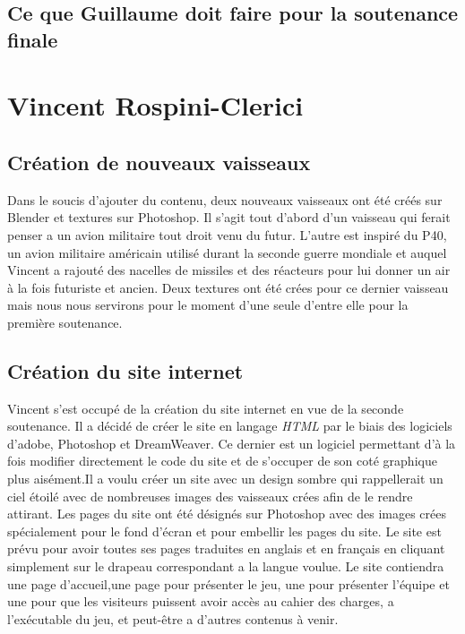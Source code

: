 \documentclass[10pt, titlepage]{report}
\begin{document}
\subsection{Ce que Guillaume doit faire pour la soutenance finale}

\section{Vincent Rospini-Clerici}

\subsection{Création de nouveaux vaisseaux}
Dans le soucis d'ajouter du contenu, deux nouveaux vaisseaux ont été créés sur Blender et textures sur Photoshop. Il s'agit tout d'abord d'un vaisseau qui ferait penser a un avion militaire tout droit venu du futur. L'autre est inspiré du P40, un avion militaire américain utilisé durant la seconde guerre mondiale et auquel Vincent a rajouté des nacelles de missiles et des réacteurs pour lui donner un air à la fois futuriste et ancien. Deux textures ont été crées pour ce dernier vaisseau mais nous nous servirons pour le moment d'une seule d'entre elle pour la première soutenance.

\subsection{Création du site internet}
Vincent s'est occupé de la création du site internet en vue de la seconde soutenance. Il a décidé de créer le site en langage \textit{HTML} par le biais des logiciels d'adobe, Photoshop et DreamWeaver. Ce dernier est un logiciel permettant d'à la fois modifier directement le code du site et de s'occuper de son coté graphique plus aisément.Il a voulu créer un site avec un design sombre qui rappellerait un ciel étoilé avec de nombreuses images des vaisseaux crées afin de le rendre attirant. Les pages du site ont été désignés sur Photoshop avec des images crées spécialement pour le fond d'écran et pour embellir les pages du site. Le site est prévu pour avoir toutes ses pages traduites en anglais et en français en cliquant simplement sur le drapeau correspondant a la langue voulue. Le site contiendra une page d'accueil,une page pour présenter le jeu, une pour présenter l'équipe et une pour que les visiteurs puissent avoir accès au cahier des charges, a l'exécutable du jeu, et peut-être a d'autres contenus à venir.
\end{document}
